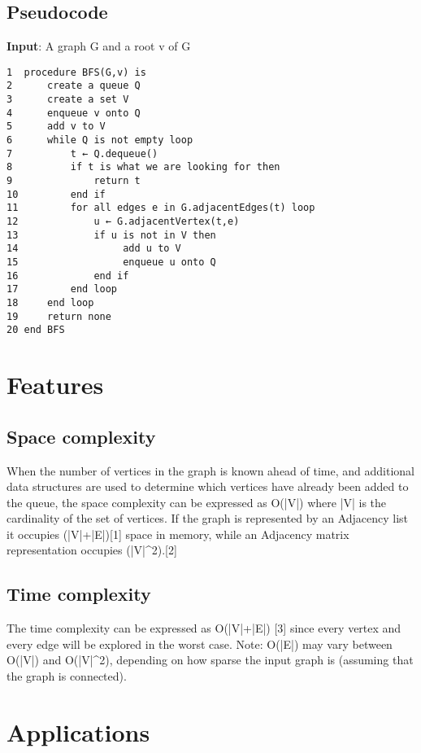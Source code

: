 \documentclass{article}
\begin{document}
\subsection{Pseudocode}

\textbf{Input}: A graph G and a root v of G

\begin{verbatim}
1  procedure BFS(G,v) is
2      create a queue Q
3      create a set V
4      enqueue v onto Q
5      add v to V
6      while Q is not empty loop
7          t ← Q.dequeue()
8          if t is what we are looking for then
9              return t
10         end if
11         for all edges e in G.adjacentEdges(t) loop
12             u ← G.adjacentVertex(t,e)
13             if u is not in V then
14                  add u to V
15                  enqueue u onto Q
16             end if
17         end loop
18     end loop
19     return none
20 end BFS
\end{verbatim}

\section{Features}

\subsection{Space complexity}

When the number of vertices in the graph is known ahead of time, and additional data structures are used to determine which vertices have already been added to the queue, the space complexity can be expressed as O(|V|) where |V| is the cardinality of the set of vertices. If the graph is represented by an Adjacency list it occupies \Theta(|V|+|E|)[1] space in memory, while an Adjacency matrix representation occupies \Theta(|V|^2).[2]

\subsection{Time complexity}

The time complexity can be expressed as O(|V|+|E|) [3] since every vertex and every edge will be explored in the worst case. Note: O(|E|) may vary between O(|V|) and  O(|V|^2), depending on how sparse the input graph is (assuming that the graph is connected).

\section{Applications}
\end{document}
